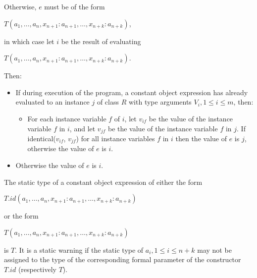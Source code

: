 \documentclass{article}
\newcommand{\code}[1]{{\sf #1}}
\begin{document}
\LMHash{}
Otherwise, $e$ must be of the form

\CONST{} $T(a_1, \ldots , a_n, x_{n+1}: a_{n+1}, \ldots , x_{n+k}: a_{n+k})$,

in which case let $i$ be the result of evaluating

\NEW{} $T(a_1, \ldots , a_n, x_{n+1}: a_{n+1}, \ldots , x_{n+k}: a_{n+k})$.

\LMHash{}
Then:
\begin{itemize}
\item If during execution of the program, a constant object expression has already evaluated to an instance $j$ of class $R$ with type arguments $V_i, 1 \le i \le m$, then:
\begin{itemize}
\item For each instance variable $f$ of $i$, let $v_{if}$ be the value of the instance variable $f$ in $i$, and let $v_{jf}$ be the value of the instance variable $f$ in $j$.
  If \code{identical($v_{if}$, $v_{jf}$)} for all instance variables $f$ in $i$ then the value of $e$ is $j$, otherwise the value of $e$ is $i$.
\end{itemize}
\item Otherwise the value of $e$ is $i$.
\end{itemize}


\LMHash{}
The static type of a constant object expression of either the form

\CONST{} $T.id(a_1, \ldots , a_n, x_{n+1}: a_{n+1}, \ldots , x_{n+k}: a_{n+k})$

or the form

\CONST{} $T(a_1, \ldots , a_n, x_{n+1}: a_{n+1}, \ldots , x_{n+k}: a_{n+k})$

is $T$. It is a static warning if the static type of $a_i, 1 \le i \le n+ k$ may not be assigned to the type of the corresponding formal parameter of the constructor $T.id$ (respectively $T$).
\end{document}
